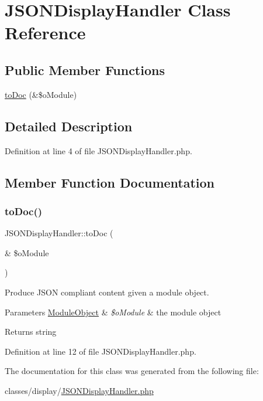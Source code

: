 \hypertarget{classJSONDisplayHandler}{}\section{J\+S\+O\+N\+Display\+Handler Class Reference}
\label{classJSONDisplayHandler}
\subsection*{Public Member Functions}
\begin{DoxyCompactItemize}
\item 
\hyperlink{classJSONDisplayHandler_aa2009f11e58e7c8206c9694d6d8b9ecf}{to\+Doc} (\&\$o\+Module)
\end{DoxyCompactItemize}


\subsection{Detailed Description}


Definition at line 4 of file J\+S\+O\+N\+Display\+Handler.\+php.



\subsection{Member Function Documentation}
\hypertarget{classJSONDisplayHandler_aa2009f11e58e7c8206c9694d6d8b9ecf}{}\label{classJSONDisplayHandler_aa2009f11e58e7c8206c9694d6d8b9ecf} 
\subsubsection{\texorpdfstring{to\+Doc()}{toDoc()}}
{\footnotesize\ttfamily J\+S\+O\+N\+Display\+Handler\+::to\+Doc (\begin{DoxyParamCaption}\item[{\&}]{\$o\+Module }\end{DoxyParamCaption})}

Produce J\+S\+ON compliant content given a module object.~\newline

\begin{DoxyParams}[1]{Parameters}
\hyperlink{classModuleObject}{Module\+Object} & {\em \$o\+Module} & the module object \\
\hline
\end{DoxyParams}
\begin{DoxyReturn}{Returns}
string 
\end{DoxyReturn}


Definition at line 12 of file J\+S\+O\+N\+Display\+Handler.\+php.



The documentation for this class was generated from the following file\+:\begin{DoxyCompactItemize}
\item 
classes/display/\hyperlink{JSONDisplayHandler_8php}{J\+S\+O\+N\+Display\+Handler.\+php}\end{DoxyCompactItemize}
